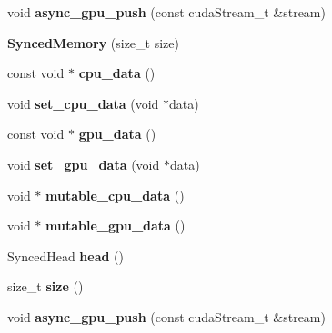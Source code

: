 \begin{DoxyCompactItemize}
void {\bfseries async\+\_\+gpu\+\_\+push} (const cuda\+Stream\+\_\+t \&stream)
\item 
\mbox{\label{classcaffe_1_1_synced_memory_a858ddd33252ddfd6e8bb2dc59ab7691b}} 
{\bfseries Synced\+Memory} (size\+\_\+t size)
\item 
\mbox{\label{classcaffe_1_1_synced_memory_a3ab3c836c1d118efd357b7a42ec53a91}} 
const void $\ast$ {\bfseries cpu\+\_\+data} ()
\item 
\mbox{\label{classcaffe_1_1_synced_memory_a4118cdf888d8663c4f88c037ce3e3b8e}} 
void {\bfseries set\+\_\+cpu\+\_\+data} (void $\ast$data)
\item 
\mbox{\label{classcaffe_1_1_synced_memory_a078df87b8bbbd8032f920f40ae79e561}} 
const void $\ast$ {\bfseries gpu\+\_\+data} ()
\item 
\mbox{\label{classcaffe_1_1_synced_memory_a9d3831fe6c03370890d76dc8a82f4ca1}} 
void {\bfseries set\+\_\+gpu\+\_\+data} (void $\ast$data)
\item 
\mbox{\label{classcaffe_1_1_synced_memory_a494df0c6dc52ff9509aad48bd7fb6665}} 
void $\ast$ {\bfseries mutable\+\_\+cpu\+\_\+data} ()
\item 
\mbox{\label{classcaffe_1_1_synced_memory_ab411a39b9e9dac1a0355a1f5f389e7a2}} 
void $\ast$ {\bfseries mutable\+\_\+gpu\+\_\+data} ()
\item 
\mbox{\label{classcaffe_1_1_synced_memory_abd3e8f08d0186d3460fcce1378a2dc4c}} 
Synced\+Head {\bfseries head} ()
\item 
\mbox{\label{classcaffe_1_1_synced_memory_ae181c18b137d62de33bc91501aabb841}} 
size\+\_\+t {\bfseries size} ()
\item 
\mbox{\label{classcaffe_1_1_synced_memory_a16308ac4986b99fb62303c4f4c1d118b}} 
void {\bfseries async\+\_\+gpu\+\_\+push} (const cuda\+Stream\+\_\+t \&stream)
\end{DoxyCompactItemize}


